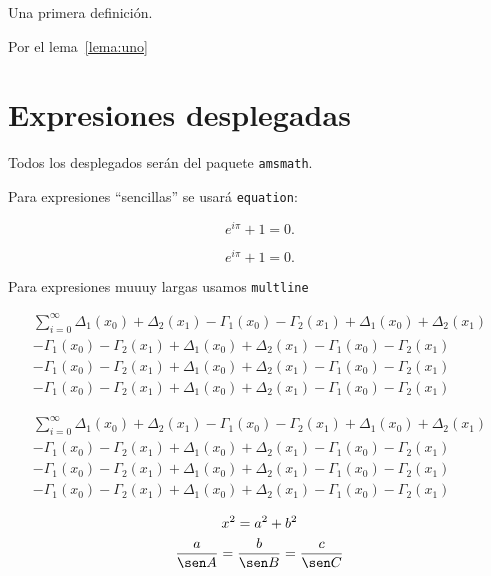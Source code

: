 \begin{defi}
  Una primera definición.
\end{defi}

\begin{obs}
Por el lema~\ref{lema:uno} 
\end{obs}

\section{Expresiones desplegadas}
Todos los desplegados serán del paquete \texttt{amsmath}.

Para expresiones \enquote{sencillas} se usará \texttt{equation}:

\begin{equation}
  e^{i\pi} + 1 = 0.
\end{equation}

\begin{equation*}
  e^{i\pi} + 1 = 0.
\end{equation*}

Para expresiones muuuy largas usamos \texttt{multline}

\begin{multline*}
  \sum_{i=0}^{\infty} \Delta_1(x_0)+\Delta_2(x_1) - \Gamma_1(x_0)-\Gamma_2(x_1) +
  \Delta_1(x_0)+\Delta_2(x_1)\\[-5pt]
  - \Gamma_1(x_0)-\Gamma_2(x_1) +
  \Delta_1(x_0)+\Delta_2(x_1) - \Gamma_1(x_0)-\Gamma_2(x_1)\\[3pt]
  - \Gamma_1(x_0)-\Gamma_2(x_1) +
  \Delta_1(x_0)+\Delta_2(x_1) - \Gamma_1(x_0)-\Gamma_2(x_1)\\[3pt]
  - \Gamma_1(x_0)-\Gamma_2(x_1) +
  \Delta_1(x_0)+\Delta_2(x_1) - \Gamma_1(x_0)-\Gamma_2(x_1)
\end{multline*}

\begin{multline*}
  \sum_{i=0}^{\infty} \Delta_1(x_0)+\Delta_2(x_1) - \Gamma_1(x_0)-\Gamma_2(x_1) +
  \Delta_1(x_0)+\Delta_2(x_1)\\
  - \Gamma_1(x_0)-\Gamma_2(x_1) +
  \Delta_1(x_0)+\Delta_2(x_1) - \Gamma_1(x_0)-\Gamma_2(x_1)\\
  - \Gamma_1(x_0)-\Gamma_2(x_1) +
  \Delta_1(x_0)+\Delta_2(x_1) - \Gamma_1(x_0)-\Gamma_2(x_1)\\
  - \Gamma_1(x_0)-\Gamma_2(x_1) +
  \Delta_1(x_0)+\Delta_2(x_1) - \Gamma_1(x_0)-\Gamma_2(x_1)
\end{multline*}

\begin{gather}
  x^2 = a^2 + b^2 \\
  \frac{a}{\sen A} =\frac{b}{\sen B} = \frac{c}{\sen C} \label{ec:leydesenos}
\end{gather}

